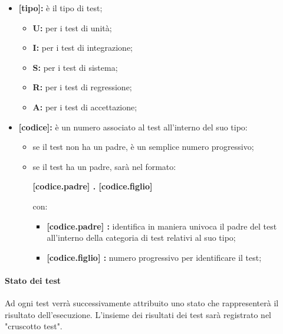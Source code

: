 \begin{itemize}
    \item \textbf{[tipo]:} 
        è il tipo di test;
        \begin{itemize}
            \item \textbf{U:} 
                per i test di unità;
            \item \textbf{I:} 
                per i test di integrazione;
            \item \textbf{S:} 
                per i test di sistema;
            \item \textbf{R:} 
                per i test di regressione;
            \item\textbf{A:} 
                per i test di accettazione;
        \end{itemize}
    \item \textbf{[codice]:} 
        è un numero associato al test all'interno del suo tipo:
        \begin{itemize}
            \item 
                se il test non ha un padre, è un semplice numero progressivo;
            \item 
                se il test ha un padre, sarà nel formato:
                \begin{center}
                    \textbf{[codice.padre] . [codice.figlio]}
                \end{center}
                con:
                \begin{itemize}
                    \item \textbf{[codice.padre] :} 
                        identifica in maniera univoca il padre del test all'interno della categoria di test relativi al suo tipo;
                    \item \textbf{[codice.figlio] :} 
                        numero progressivo per identificare il test;
                \end{itemize}
        \end{itemize}
\end{itemize}

\paragraph{Stato dei test}
Ad ogni test verrà successivamente attribuito uno stato che rappresenterà il risultato dell'esecuzione. L'insieme dei risultati dei test sarà registrato nel "cruscotto test".


